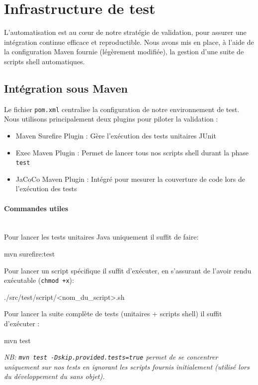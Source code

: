 \section{Infrastructure de test}
\noindent
L'automatisation est au cœur de notre stratégie de validation, pour assurer une intégration continue efficace et reproductible. Nous avons mis en place, à l'aide de la configuration Maven fournie (légèrement modifiée), la gestion d'une suite de scripts shell automatiques.

\subsection{Intégration sous Maven}
\noindent Le fichier \texttt{pom.xml} centralise la configuration de notre environnement de test. Nous utilisons principalement deux plugins pour piloter la validation : 
\begin{itemize} [label=$\circ$]
    \item Maven Surefire Plugin : Gère l'exécution des tests unitaires JUnit 
    \item Exec Maven Plugin : Permet de lancer tous nos scripts shell durant la phase \texttt{test}
    \item JaCoCo Maven Plugin : Intégré pour mesurer la couverture de code lors de l'exécution des tests
\end{itemize}

\paragraph*{Commandes utiles} \mbox{} \\ 
\noindent
Pour lancer les tests unitaires Java uniquement il suffit de faire: 
\begin{command} 
mvn surefire:test
\end{command} 
\noindent
Pour lancer un script spécifique il suffit d'exécuter, en s'assurant de l'avoir rendu exécutable (\texttt{chmod +x}):
\begin{command}
./src/test/script/<nom_du_script>.sh
\end{command}
\noindent
Pour lancer la suite complète de tests (unitaires + scripts shell) il suffit d'exécuter :
\begin{command}
mvn test
\end{command}
\noindent \textit{NB: \texttt{mvn test -Dskip.provided.tests=true} permet de se concentrer uniquement sur nos tests en ignorant les scripts fournis initialement (utilisé lors du développement du sans objet).}

